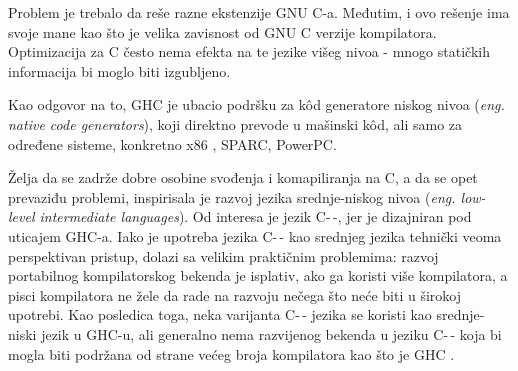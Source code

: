 Problem je trebalo da reše razne ekstenzije GNU C-a. Međutim, i ovo rešenje ima svoje mane kao što je velika zavisnost od GNU C verzije kompilatora. Optimizacija za C često nema efekta na te jezike višeg nivoa - mnogo statičkih informacija bi moglo biti izgubljeno. 

Kao odgovor na to, GHC je ubacio podršku za k\^{o}d generatore niskog nivoa (\emph{eng. native code generators}), koji direktno prevode u mašinski k\^{o}d, ali samo za određene sisteme, konkretno x86 , SPARC, PowerPC.

Želja da se zadrže dobre osobine svođenja i komapiliranja na C, a da se opet prevaziđu problemi, inspirisala je razvoj jezika srednje-niskog nivoa (\emph{eng. low-level intermediate languages}). Od interesa je jezik C-\,-, jer je dizajniran pod uticajem GHC-a. Iako je upotreba jezika C-\,- kao srednjeg jezika tehnički veoma perspektivan pristup, dolazi sa velikim praktičnim problemima: razvoj portabilnog kompilatorskog bekenda je isplativ, ako ga koristi više kompilatora, a pisci kompilatora ne žele da rade na razvoju nečega što neće biti u širokoj upotrebi. Kao posledica toga, neka varijanta C-\,- jezika se koristi kao srednje-niski jezik u GHC-u, ali generalno nema razvijenog bekenda u jeziku C-\,- koja bi mogla biti podržana od strane većeg broja kompilatora kao što je GHC \cite{SPJ92}.


